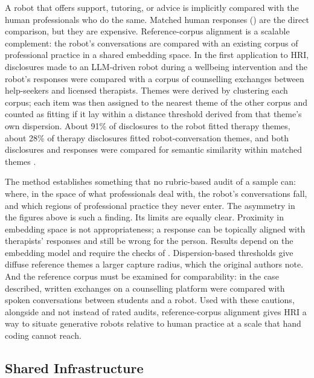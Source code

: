 A robot that offers support, tutoring, or advice is implicitly compared with
the human professionals who do the same. Matched human responses
() are the direct comparison, but they are expensive.
Reference-corpus alignment is a scalable complement: the robot's
conversations are compared with an existing corpus of professional practice
in a shared embedding space. In the first application to HRI, disclosures
made to an LLM-driven robot during a wellbeing intervention and the robot's
responses were compared with a corpus of counselling exchanges between
help-seekers and licensed therapists. Themes were derived by clustering each
corpus; each item was then assigned to the nearest theme of the other corpus
and counted as fitting if it lay within a distance threshold derived from
that theme's own dispersion. About 91\% of disclosures to the robot fitted
therapy themes, about 28\% of therapy disclosures fitted robot-conversation
themes, and both disclosures and responses were compared for semantic
similarity within matched themes \cite{chiang2025talk}.

The method establishes something that no rubric-based audit of a sample can:
where, in the space of what professionals deal with, the robot's
conversations fall, and which regions of professional practice they never
enter. The asymmetry in the figures above is such a finding. Its limits are
equally clear. Proximity in embedding space is not appropriateness; a
response can be topically aligned with therapists' responses and still be
wrong for the person. Results depend on the embedding model and require the
checks of . Dispersion-based thresholds give diffuse reference
themes a larger capture radius, which the original authors note. And the
reference corpus must be examined for comparability: in the case described,
written exchanges on a counselling platform were compared with spoken
conversations between students and a robot. Used with these cautions,
alongside and not instead of rated audits, reference-corpus alignment gives
HRI a way to situate generative robots relative to human practice at a scale
that hand coding cannot reach.

\subsection{Shared Infrastructure}
\label{sec:infrastructure}

